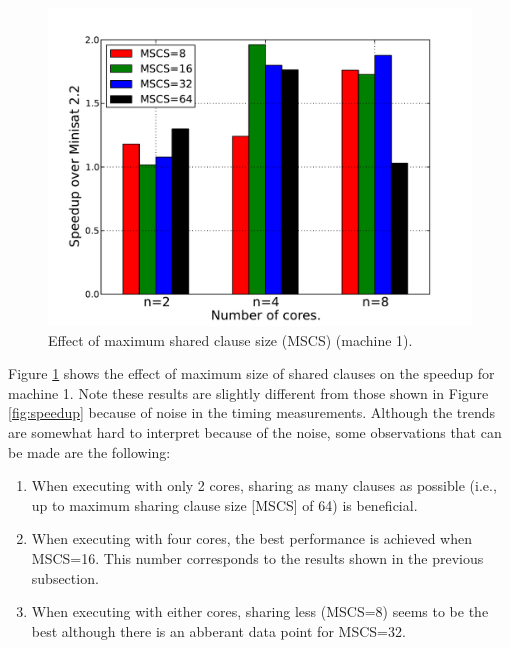 \documentclass[letterpaper, compsoc, conference]{IEEEtran}
\begin{document}
\begin{figure}[htbp]
    \begin{center}
        \includegraphics[width=\columnwidth]{images/mcs.pdf}
        \caption{Effect of maximum shared clause size (MSCS) (machine 1).}
        \label{fig:mscs}
    \end{center}
\end{figure}

Figure \ref{fig:mscs} shows the effect of maximum size of shared clauses on the
speedup for machine 1. Note these results are slightly different from those
shown in Figure \ref{fig:speedup} because of noise in the timing measurements.
Although the trends are somewhat hard to interpret because of the noise, some
observations that can be made are the following:

\begin{enumerate}

\item When executing with only 2 cores, sharing as many clauses as possible
(i.e., up to maximum sharing clause size [MSCS] of 64) is beneficial.

\item When executing with four cores, the best performance is achieved when
MSCS=16. This number corresponds to the results shown in the previous
subsection.

\item When executing with either cores, sharing less (MSCS=8) seems to be the
best although there is an abberant data point for MSCS=32.
     
\end{enumerate}
\end{document}
